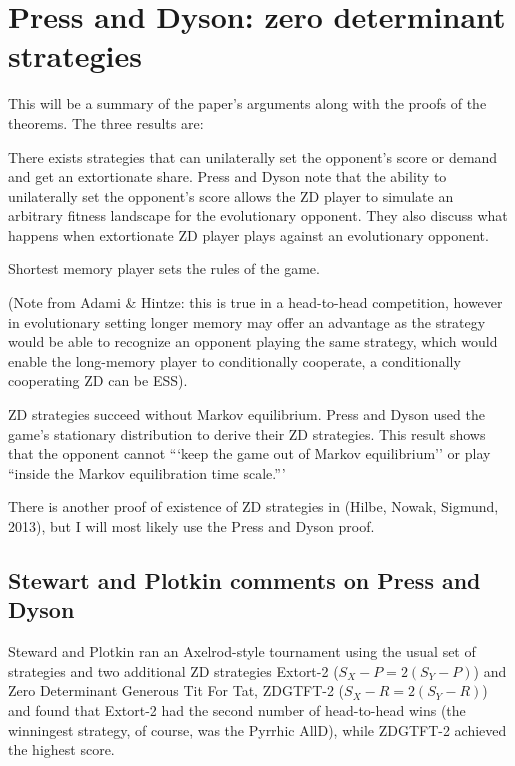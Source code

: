 \section{Press and Dyson: zero determinant strategies}
This will be a summary of the paper's arguments along with the proofs of the theorems. The three results are:

\begin{theorem}
There exists strategies that can unilaterally set the opponent's score or demand and get an extortionate share. Press and Dyson note that the ability to unilaterally set the opponent's score allows the ZD player to simulate an arbitrary fitness landscape for the evolutionary opponent. They also discuss what happens when extortionate ZD player plays against an evolutionary opponent. 
\end{theorem}
\begin{theorem}
Shortest memory player sets the rules of the game.

(Note from Adami \& Hintze: this is true in a head-to-head competition, however in evolutionary setting longer memory may offer an advantage as the strategy would be able to recognize an opponent playing the same strategy, which would enable the long-memory player to conditionally cooperate, a conditionally cooperating ZD can be ESS).
\end{theorem}
\begin{theorem}
ZD strategies succeed without Markov equilibrium. Press and Dyson used the game's stationary distribution to derive their ZD strategies. This result shows that the opponent cannot  ```keep the game out of Markov equilibrium'' or play ``inside the Markov equilibration time scale.'''
\end{theorem}


There is another proof of existence of ZD strategies in (Hilbe, Nowak, Sigmund, 2013), but I will most likely use the Press and Dyson proof.

\subsection{Stewart and Plotkin comments on Press and Dyson}
Steward and Plotkin ran an Axelrod-style tournament using the usual set of strategies and two additional ZD strategies Extort-2 ($S_X - P = 2(S_Y - P)$) and Zero Determinant Generous Tit For Tat, ZDGTFT-2 ($S_X - R = 2(S_Y - R)$) and found that Extort-2 had the second number of head-to-head wins (the winningest strategy, of course, was the Pyrrhic AllD), while ZDGTFT-2 achieved the highest score.


